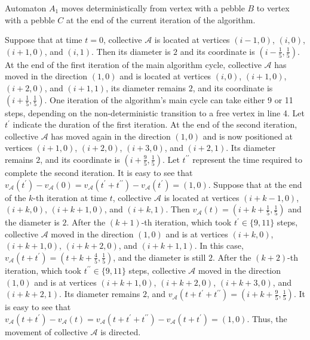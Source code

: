\documentclass{article}
\newenvironment{proof}[1][Proof]{\begin{trivlist}
\item[\hskip \labelsep {\bfseries #1}]}{\end{trivlist}}
\newcommand{\qed}{\nobreak \ifvmode \relax \else
      \ifdim\lastskip<1.5em \hskip-\lastskip
      \hskip1.5em plus0em minus0.5em \fi \nobreak
      \vrule height0.75em width0.5em depth0.25em\fi}
\begin{document}
\begin{proof}
Automaton $A_{1}$ moves deterministically from vertex with a pebble $B$ to vertex with a pebble $C$ at the end of the current iteration of the algorithm.

Suppose that at time $t=0$, collective $\mathcal{A}$ is located at vertices $( i-1, 0 )$, $( i, 0 )$, $( i+1, 0 )$, and $( i, 1 )$. 
Then its diameter is $2$ and its coordinate is $\left( i-\frac{1}{5}, \frac{1}{5} \right)$. 
At the end of the first iteration of the main algorithm cycle, collective $\mathcal{A}$ has moved in the direction $( 1, 0 )$ and is located at vertices $( i, 0 )$, $( i+1, 0 )$, $( i+2, 0 )$, and $( i+1, 1 )$, its diameter remains $2$, and its coordinate is $\left( i+\frac{1}{5}, \frac{1}{5} \right)$.
One iteration of the algorithm's main cycle can take either 9 or 11 steps, depending on the non-deterministic transition to a free vertex in line 4. 
Let $t^{\prime}$ indicate the duration of the first iteration.
At the end of the second iteration, collective $\mathcal{A}$ has moved again in the direction $( 1, 0 )$ and is now positioned at vertices $( i+1, 0 )$, $( i+2, 0 )$, $( i+3, 0 )$, and $( i+2, 1 )$. 
Its diameter remains $2$, and its coordinate is $\left( i+\frac{9}{5}, \frac{1}{5} \right)$.
Let $t^{\prime\prime}$ represent the time required to complete the second iteration.
It is easy to see that $v_{\mathcal{A}} \left( t^{\prime} \right) - v_{\mathcal{A}} (0) = v_{\mathcal{A}} \left( t^{\prime}+t^{\prime\prime} \right) - v_{\mathcal{A}} \left( t^{\prime} \right) = (1, 0)$.
Suppose that at the end of the $k$-th iteration at time $t$, collective $\mathcal{A}$ is located at vertices $( i+k-1, 0 )$, $( i+k, 0 )$, $( i+k+1, 0 )$, and $( i+k, 1 )$.
Then $v_{\mathcal{A}}(t) = \left( i+k+\frac{1}{5}, \frac{1}{5} \right)$ and the diameter is $2$.
After the $(k+1)$-th iteration, which took $t^{\prime} \in \{ 9, 11 \}$ steps, collective $\mathcal{A}$ moved in the direction $(1, 0)$ and is at vertices $( i+k, 0 )$, $( i+k+1, 0 )$, $( i+k+2, 0 )$, and $( i+k+1, 1 )$. 
In this case, $v_{\mathcal{A}} \left( t+t^{\prime} \right) = \left( t+k+\frac{4}{5}, \frac{1}{5} \right)$, and the diameter is still $2$.
After the $(k+2)$-th iteration, which took $t^{\prime\prime} \in \{ 9, 11 \}$ steps, collective $\mathcal{A}$ moved in the direction $(1, 0)$ and is at vertices $( i+k+1, 0 )$, $( i+k+2, 0 )$, $( i+k+3, 0 )$, and $( i+k+2, 1 )$.
Its diameter remains $2$, and $v_{\mathcal{A}} \left( t+t^{\prime}+t^{\prime\prime} \right) = \left( i+k+\frac{9}{5}, \frac{1}{5} \right)$.
It is easy to see that $v_{\mathcal{A}} \left( t+t^{\prime} \right) - v_{\mathcal{A}} (t) = v_{\mathcal{A}} \left( t+t^{\prime}+t^{\prime\prime}\right) - v_{\mathcal{A}} \left( t+t^{\prime} \right) = ( 1, 0 )$.
Thus, the movement of collective $\mathcal{A}$ is directed. \qed
\end{proof}
\end{document}
